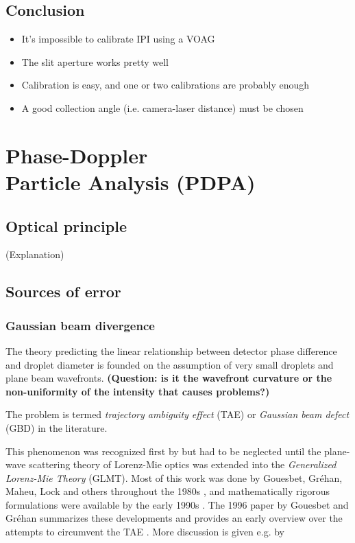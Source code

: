 \documentclass[11.5pt]{book}
\begin{document}
\section{Conclusion}
\begin{itemize}
    \item It's impossible to calibrate IPI using a VOAG
    \item The slit aperture works pretty well
    \item Calibration is easy, and one or two calibrations are probably enough
    \item A good collection angle (i.e. camera-laser distance) must be chosen
\end{itemize}

\chapter{Phase-Doppler\\Particle Analysis (PDPA)}

\section{Optical principle}
(Explanation)

\section{Sources of error}
\subsection{Gaussian beam divergence}
The theory predicting the linear relationship between detector phase difference
and droplet diameter is founded on the assumption of very small droplets and
plane beam wavefronts. \textbf{(Question: is it the wavefront curvature or the
non-uniformity of the intensity that causes problems?)}

The problem is termed \emph{trajectory ambiguity effect} (TAE) or \emph{Gaussian
beam defect} (GBD) in the literature.

This phenomenon was recognized first by \citet{Saffman86} but had to be neglected until
the plane-wave scattering theory of Lorenz-Mie optics was extended into
the \emph{Generalized Lorenz-Mie Theory} (GLMT). Most of this work was
done by Gouesbet, Gréhan, Maheu, Lock and others throughout the 1980s
\cite{Grehan80, Gouesbet82, Gouesbet88, Maheu88}, and mathematically
rigorous formulations were available by the early 1990s \cite{Lock94,
Gouesbet94}. The 1996 paper by Gouesbet and Gréhan summarizes these developments
and provides an early overview over the attempts to circumvent the TAE
\cite{Gouesbet96}. More discussion is given e.g. by 
\end{document}
